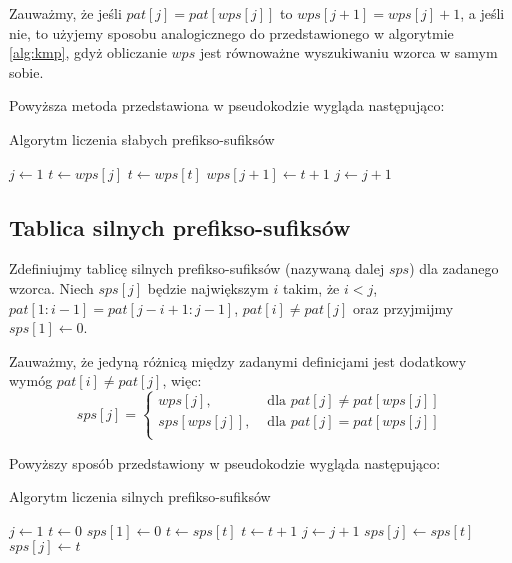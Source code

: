 Zauważmy, że jeśli $pat[j] = pat[wps[j]]$ to $wps[j+1] = wps[j] + 1$, a jeśli nie, to użyjemy sposobu analogicznego do przedstawionego w algorytmie \ref{alg:kmp}, gdyż obliczanie $wps$ jest równoważne wyszukiwaniu wzorca w samym sobie.

\noindent
Powyższa metoda przedstawiona w pseudokodzie wygląda następująco: 
\begin{algorithm}
\caption{Algorytm liczenia słabych prefikso-sufiksów}\label{alg:wps}
\begin{algorithmic}[1]
\State $j \gets 1$
    \State $t \gets wps[j]$
        \State $t \gets wps[t]$
    \EndWhile
    \State $wps[j + 1] \gets t + 1$
    \State $j \gets j + 1$
\EndWhile
\end{algorithmic}
\end{algorithm}

\subsection*{Tablica silnych prefikso-sufiksów}
Zdefiniujmy tablicę silnych prefikso-sufiksów (nazywaną dalej $sps$) dla zadanego wzorca. Niech $sps[j]$ będzie największym $i$ takim, że $i < j$, $pat[1:i-1] = pat[j-i+1:j-1]$, $pat[i] \neq pat[j]$ oraz przyjmijmy $sps[1] \gets 0$.

Zauważmy, że jedyną różnicą między zadanymi definicjami jest dodatkowy wymóg $pat[i] \neq pat[j]$, więc:
\[
    sps[j]= 
    \begin{cases}
        wps[j],& \text{ dla } pat[j] \neq pat[wps[j]]\\
        sps[wps[j]],& \text{ dla } pat[j] = pat[wps[j]]\\
    \end{cases}
\]

\newpage
\noindent
Powyższy sposób przedstawiony w pseudokodzie wygląda następująco: 
\begin{algorithm}
\caption{Algorytm liczenia silnych prefikso-sufiksów}\label{alg:sps}
\begin{algorithmic}[1]
\State $j \gets 1$
\State $t \gets 0$
\State $sps[1] \gets 0$
        \State $t \gets sps[t]$
    \EndWhile
    \State $t \gets t + 1$
    \State $j \gets j + 1$
        \State $sps[j] \gets sps[t]$ 
    \Else
        \State $sps[j] \gets t$
    \EndIf
\EndWhile
\end{algorithmic}
\end{algorithm}

